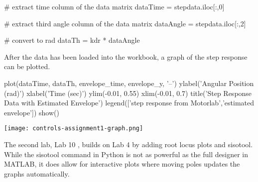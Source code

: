 \begin{tcolorbox}[breakable, enhanced jigsaw, title=ME 570: Assignment \ref{control_assignment_1}, 
    colframe=ksu-purple, colback=ksu-gray]
\begin{python}
# extract time column of the data matrix
dataTime = stepdata.iloc[:,0]

# extract third angle column of the data matrix
dataAngle = stepdata.iloc[:,2]

# convert to rad
dataTh = kdr * dataAngle
\end{python}

After the data has been loaded into the workbook, a graph of the step
response can be plotted.

\begin{python}
plot(dataTime, dataTh, envelope_time, envelope_y, '--')
ylabel('Angular Position (rad)')
xlabel('Time (sec)')
ylim(-0.01, 0.55)
xlim(-0.01, 0.7)
title('Step Response Data with Estimated Envelope')
legend(['step response from Motorlab','estimated envelope'])
show()
\end{python}

\begin{center}
    \texttt{[image: controls-assignment1-graph.png]}
\end{center}

\end{tcolorbox}

The second lab, Lab 10 \cite{controls-10}, builds on Lab 4 by adding root locus plots and sisotool. While the
sisotool command in Python is not as powerful as the full designer in MATLAB, it does allow 
for interactive plots where moving poles updates the graphs automatically. 

\label{control_assignment_2}

